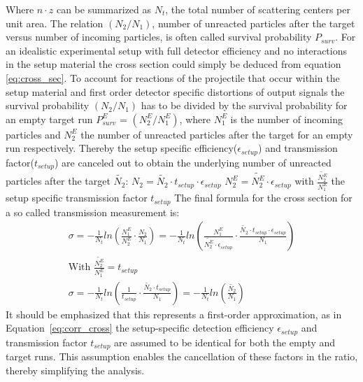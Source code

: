 Where $n\cdot z$ can be summarized as $N_t$, the total number of scattering centers per unit area. The relation $(N_{2}/N_{1})$, number of unreacted particles after the target versus number of incoming particles, is often called survival probability $P_{surv}$. For an idealistic experimental setup with full detector efficiency and no interactions in the setup material the cross section could simply be deduced from equation \ref{eq:cross_sec}. To account for reactions of the projectile that occur within the setup material and first order detector specific distortions of output signals the survival probability $(N_{2}/N_{1})$ has to be divided by the survival probability for an empty target run $P^{E}_{surv}$ = $(N_{2}^E/N_{1}^E)$, where $N_{1}^E$ is the number of incoming particles and $N_{2}^E$ the number of unreacted particles after the target for an empty run respectively. Thereby the setup specific efficiency($\epsilon_{setup}$) and transmission factor($t_{setup}$) are canceled out to obtain the underlying number of unreacted particles after the target $\tilde{N_{2}}$:\newline
$N_{2} = \tilde{N_{2}} \cdot t_{setup}\cdot \epsilon_{setup}$\newline
$N_{2}^E = \tilde{N_{2}^E} \cdot \epsilon_{setup}$ with $\frac{\tilde{N_{2}^E}}{N_{1}^E}$ the setup specific transmission factor $t_{setup}$ \newline
\newline
The final formula for the cross section for a so called transmission measurement is:
\begin{equation}
	\begin{split}
\sigma = -\frac{1}{N_t} ln(\frac{N_{1}^E}{N_{2}^E} \cdot \frac{N_2}{N_1}) = -\frac{1}{N_t} ln(\frac{N_{1}^E}{\tilde{N_{2}^E} \cdot \epsilon_{setup}} \cdot \frac{\tilde{N_{2}} \cdot t_{setup} \cdot \epsilon_{setup}}{N_1}) \\
\text{With $\frac{\tilde{N_{2}^E}}{N_{1}^E} = t_{setup}$} \\
\sigma = -\frac{1}{N_t} ln(\frac{1}{t_{setup}} \cdot \frac{\tilde{N_{2}} \cdot t_{setup}}{N_1}) = -\frac{1}{N_t} ln(\frac{\tilde{N_{2}}}{N_1})
\label{eq:corr_cross}
	\end{split}
\end{equation}
It should be emphasized that this represents a first-order approximation, as in Equation~\ref{eq:corr_cross} the setup-specific detection efficiency $\epsilon_{setup}$ and transmission factor $t_{setup}$ are assumed to be identical for both the empty and target runs. This assumption enables the cancellation of these factors in the ratio, thereby simplifying the analysis.\newline
